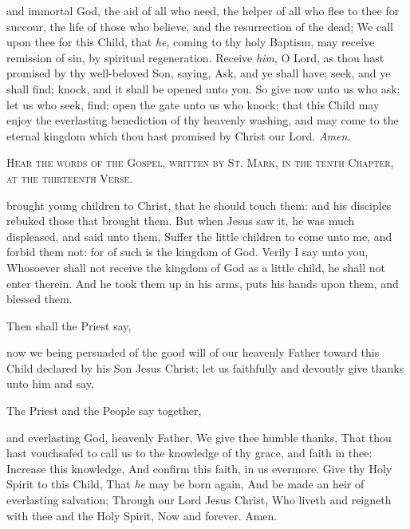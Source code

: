 {} and immortal God, the aid of all who need, the helper of all who flee to thee for succour, the life of those who believe, and the resurrection of the dead; We call upon thee for this Child, that \emph{he}, coming to thy holy Baptism, may receive remission of sin, by spiritual regeneration. Receive \emph{him}, O Lord, as thou hast promised by thy well-beloved Son, saying, Ask, and ye shall have; seek, and ye shall find; knock, and it shall be opened unto you. So give now unto us who ask; let us who seek, find; open the gate unto us who knock; that this Child may enjoy the everlasting benediction of thy heavenly washing, and may come to the eternal kingdom which thou hast promised by Christ our Lord. \textit{Amen.}

\clearpage
\begin{center}
	\textsc{Hear the words of the Gospel, written by St. Mark, in the tenth Chapter, at the thirteenth Verse.}
\end{center}

 brought young children to Christ, that he should touch them: and his disciples rebuked those that brought them. But when Jesus saw it, he was much displeased, and said unto them, Suffer the little children to come unto me, and forbid them not: for of such is the kingdom of God. Verily I say unto you, Whosoever shall not receive the kingdom of God as a little child, he shall not enter therein. And he took them up in his arms, puts his hands upon them, and blessed them.

\begin{rubric}
	Then shall the Priest say,
\end{rubric}

 now we being persuaded of the good will of our heavenly Father toward this Child declared by his Son Jesus Christ; let us faithfully and devoutly give thanks unto him and say,

\begin{rubric}
	The Priest and the People say together,
\end{rubric}

 and everlasting God, heavenly Father, We give thee humble thanks, That thou hast vouchsafed to call us to the knowledge of thy grace, and faith in thee: Increase this knowledge, And confirm this faith, in us evermore. Give thy Holy Spirit to this Child, That \emph{he} may be born again, And be made an heir of everlasting salvation; Through our Lord Jesus Christ, Who liveth and reigneth with thee and the Holy Spirit, Now and forever. Amen.

